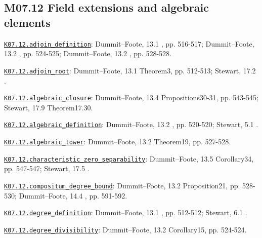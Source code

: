 \subsection*{M07.12 Field extensions and algebraic elements}
\par\smallskip\noindent\hypertarget{src:K07.12.adjoin_definition}{}\label{src:K07.12.adjoin_definition}\hyperref[K07.12.adjoin_definition]{\texttt{K07.12.adjoin\_definition}}: Dummit--Foote, 13.1 , pp. 516-517; Dummit--Foote, 13.2 , pp. 524-525; Dummit--Foote, 13.2 , pp. 528-528.
\par\smallskip\noindent\hypertarget{src:K07.12.adjoin_root}{}\label{src:K07.12.adjoin_root}\hyperref[K07.12.adjoin_root]{\texttt{K07.12.adjoin\_root}}: Dummit--Foote, 13.1 Theorem3, pp. 512-513; Stewart, 17.2 .
\par\smallskip\noindent\hypertarget{src:K07.12.algebraic_closure}{}\label{src:K07.12.algebraic_closure}\hyperref[K07.12.algebraic_closure]{\texttt{K07.12.algebraic\_closure}}: Dummit--Foote, 13.4 Propositions30-31, pp. 543-545; Stewart, 17.9 Theorem17.30.
\par\smallskip\noindent\hypertarget{src:K07.12.algebraic_definition}{}\label{src:K07.12.algebraic_definition}\hyperref[K07.12.algebraic_definition]{\texttt{K07.12.algebraic\_definition}}: Dummit--Foote, 13.2 , pp. 520-520; Stewart, 5.1 .
\par\smallskip\noindent\hypertarget{src:K07.12.algebraic_tower}{}\label{src:K07.12.algebraic_tower}\hyperref[K07.12.algebraic_tower]{\texttt{K07.12.algebraic\_tower}}: Dummit--Foote, 13.2 Theorem19, pp. 527-528.
\par\smallskip\noindent\hypertarget{src:K07.12.characteristic_zero_separability}{}\label{src:K07.12.characteristic_zero_separability}\hyperref[K07.12.characteristic_zero_separability]{\texttt{K07.12.characteristic\_zero\_separability}}: Dummit--Foote, 13.5 Corollary34, pp. 547-547; Stewart, 17.5 .
\par\smallskip\noindent\hypertarget{src:K07.12.compositum_degree_bound}{}\label{src:K07.12.compositum_degree_bound}\hyperref[K07.12.compositum_degree_bound]{\texttt{K07.12.compositum\_degree\_bound}}: Dummit--Foote, 13.2 Proposition21, pp. 528-530; Dummit--Foote, 14.4 , pp. 591-592.
\par\smallskip\noindent\hypertarget{src:K07.12.degree_definition}{}\label{src:K07.12.degree_definition}\hyperref[K07.12.degree_definition]{\texttt{K07.12.degree\_definition}}: Dummit--Foote, 13.1 , pp. 512-512; Stewart, 6.1 .
\par\smallskip\noindent\hypertarget{src:K07.12.degree_divisibility}{}\label{src:K07.12.degree_divisibility}\hyperref[K07.12.degree_divisibility]{\texttt{K07.12.degree\_divisibility}}: Dummit--Foote, 13.2 Corollary15, pp. 524-524.

